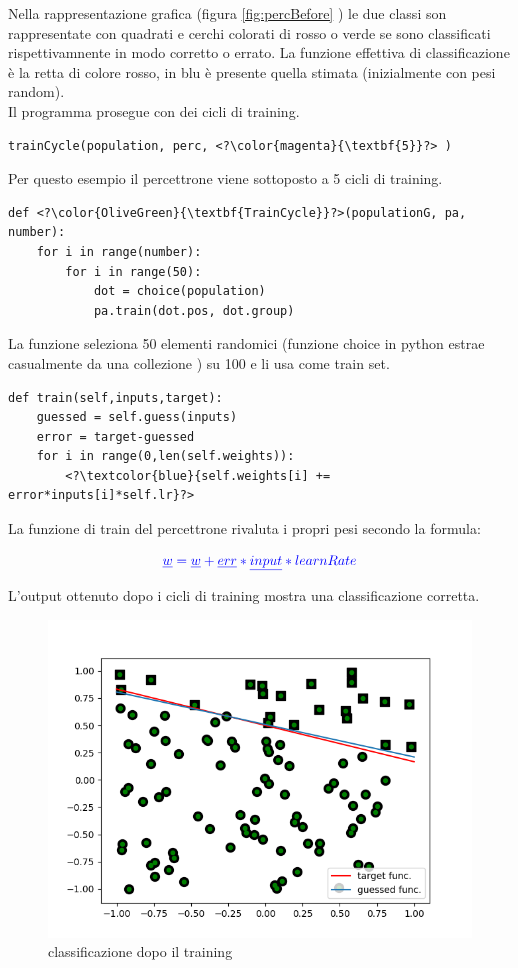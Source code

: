 \documentclass[12pt]{article}
\begin{document}
Nella rappresentazione grafica (figura \ref{fig:percBefore} ) le due classi son rappresentate con quadrati e cerchi colorati di rosso o verde se sono classificati rispettivamnente in modo corretto o errato.
La funzione effettiva di classificazione è la retta di colore rosso, in blu è presente quella stimata (inizialmente con pesi random).\\
Il programma prosegue con dei cicli di training.
\begin{lstlisting}[language=myPython]
 trainCycle(population, perc, <?\color{magenta}{\textbf{5}}?> )
\end{lstlisting}
Per questo esempio il percettrone viene sottoposto a {\color{magenta}5} cicli di training.
\begin{lstlisting}[language=myPython]
 def <?\color{OliveGreen}{\textbf{TrainCycle}}?>(populationG, pa, number):
	for i in range(number):
		for i in range(50):
			dot = choice(population)
			pa.train(dot.pos, dot.group)
\end{lstlisting}
La funzione {} seleziona 50 elementi randomici (funzione choice in python estrae casualmente da una collezione ) su 100 e li usa come train set.
\newpage
\begin{lstlisting}[language=myPython]
 def train(self,inputs,target):
	guessed = self.guess(inputs)
	error = target-guessed
	for i in range(0,len(self.weights)):
		<?\textcolor{blue}{self.weights[i] += error*inputs[i]*self.lr}?>
\end{lstlisting}
La funzione di train del percettrone rivaluta i propri pesi secondo la formula:

$$\color{blue}\underline{w}=\underline{w}+\underline{err}*\underline{input}*learnRate$$

L'output ottenuto dopo i cicli di training mostra una classificazione corretta.
\begin{figure}[h!]
	\centering
	\includegraphics[width=10 cm]{Perc_after.png}
	\caption{classificazione dopo il training}
	\label{fig:percAfter}
\end{figure}
\newpage
\end{document}
